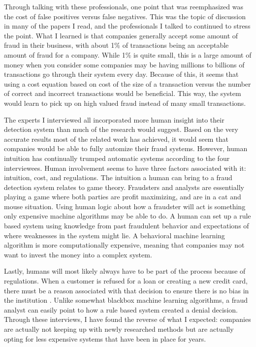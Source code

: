 \documentclass[midd]{thesis}
\begin{document}
Through talking with these professionals, one point that was reemphasized was the cost of false positives versus false negatives. This was the topic of discussion in many of the papers I read, and the professionals I talked to continued to stress the point. What I learned is that companies generally accept some amount of fraud in their business, with about 1\% of transactions being an acceptable amount of fraud for a company. While 1\% is quite small, this is a large amount of money when you consider some companies may be having millions to billions of transactions go through their system every day. Because of this, it seems that using a cost equation based on cost of the size of a transaction versus the number of correct and incorrect transactions would be beneficial. This way, the system would learn to pick up on high valued fraud instead of many small transactions.

The experts I interviewed all incorporated more human insight into their detection system than much of the research would suggest. Based on the very accurate results most of the related work has achieved, it would seem that companies would be able to fully automize their fraud systems. However, human intuition has continually trumped automatic systems according to the four interviewees. Human involvement seems to have three factors associated with it: intuition, cost, and regulations. The intuition a human can bring to a fraud detection system relates to game theory. Fraudsters and analysts are essentially playing a game where both parties are profit maximizing, and are in a cat and mouse situation. Using human logic about how a fraudster will act is something only expensive machine algorithms may be able to do. A human can set up a rule based system using knowledge from past fraudulent behavior and expectations of where weaknesses in the system might lie. A behavioral machine learning algorithm is more computationally expensive, meaning that companies may not want to invest the money into a complex system. 

Lastly, humans will most likely always have to be part of the process because of regulations. When a customer is refused for a loan or creating a new credit card, there must be a reason associated with that decision to ensure there is no bias in the institution \cite{FDIC}. Unlike somewhat blackbox machine learning algorithms, a fraud analyst can easily point to how a rule based system created a denial decision. Through these interviews, I have found the reverse of what I expected: companies are actually not keeping up with newly researched methods but are actually opting for less expensive systems that have been in place for years. 
\end{document}
